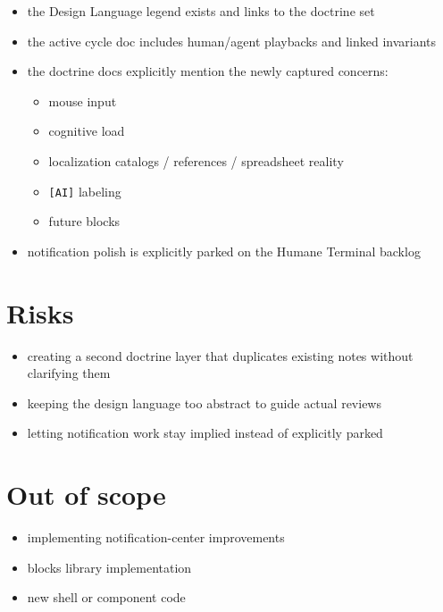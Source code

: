 \begin{itemize}
\tightlist
\item
  the Design Language legend exists and links to the doctrine set
\item
  the active cycle doc includes human/agent playbacks and linked invariants
\item
  the doctrine docs explicitly mention the newly captured concerns:

  \begin{itemize}
  \tightlist
  \item
    mouse input
  \item
    cognitive load
  \item
    localization catalogs / references / spreadsheet reality
  \item
    \texttt{[\allowbreak{}A\allowbreak{}I\allowbreak{}]} labeling
  \item
    future blocks
  \end{itemize}
\item
  notification polish is explicitly parked on the Humane Terminal backlog
\end{itemize}

\section{Risks}\label{record-168-risks}

\begin{itemize}
\tightlist
\item
  creating a second doctrine layer that duplicates existing notes without clarifying them
\item
  keeping the design language too abstract to guide actual reviews
\item
  letting notification work stay implied instead of explicitly parked
\end{itemize}

\section{Out of scope}\label{record-168-out-of-scope}

\begin{itemize}
\tightlist
\item
  implementing notification-center improvements
\item
  blocks library implementation
\item
  new shell or component code
\end{itemize}

